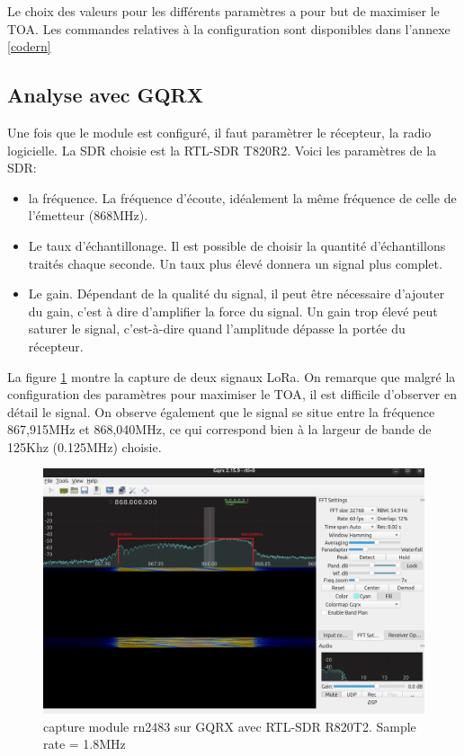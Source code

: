\vspace{0.1cm}

Le choix des valeurs pour les différents paramètres a pour but de maximiser le \ac{TOA}. Les commandes relatives à la configuration sont disponibles dans l'annexe \ref{codern}

\subsection{Analyse avec GQRX}

Une fois que le module est configuré, il faut paramètrer le récepteur, la radio logicielle. La \ac{SDR} choisie est la RTL-SDR T820R2. Voici les paramètres de la \ac{SDR}:

\vspace{0.1cm}

\begin{itemize}
\item la fréquence. La fréquence d'écoute, idéalement la même fréquence de celle de l'émetteur (868MHz).
\item Le taux d'échantillonage. Il est possible de choisir la quantité d'échantillons traités chaque seconde. Un taux plus élevé donnera un signal plus complet.
\item Le gain. Dépendant de la qualité du signal, il peut être nécessaire d'ajouter du gain, c'est à dire d'amplifier la force du signal. Un gain trop élevé peut saturer le signal, c'est-à-dire quand l'amplitude dépasse la portée du récepteur.
\end{itemize}

\vspace{0.1cm}

La figure \ref{term301} montre la capture de deux signaux LoRa. On remarque que malgré la configuration des paramètres pour maximiser le \ac{TOA}, il est difficile d'observer en détail le signal. On observe également que le signal se situe entre la fréquence 867,915MHz et 868,040MHz, ce qui correspond bien à la largeur de bande de 125Khz (0.125MHz) choisie.

\begin{figure}[h]
\centering

\includegraphics[scale=0.28]{images/gqrx4.png}
\caption{capture module rn2483 sur GQRX avec RTL-SDR R820T2. Sample rate = 1.8MHz}\label{term301}
\end{figure}

